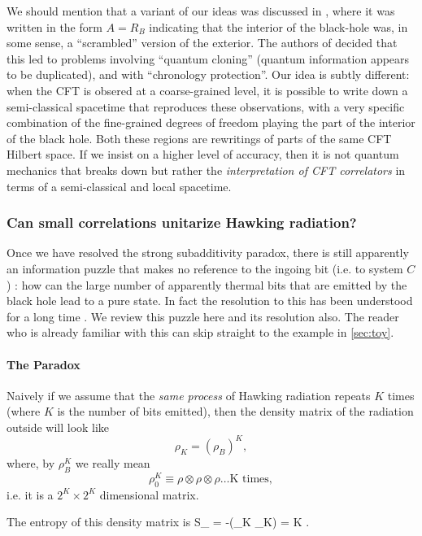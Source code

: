 We should mention that a variant of our ideas was discussed in \cite{Bousso:2012as,Susskind:2012uw}, where it was written in the form $A = R_B$ indicating that the interior of the black-hole was, in some sense, a ``scrambled'' version of the exterior. The authors of \cite{Bousso:2012as,Susskind:2012uw} decided that this led to problems involving ``quantum cloning'' (quantum information appears to be duplicated), and with ``chronology protection''. Our idea is subtly different: when the CFT is obsered at a coarse-grained level, it is possible to write down a semi-classical spacetime that reproduces these observations, with a very specific combination of the fine-grained degrees of freedom playing the part of the interior of the black hole. Both these regions are rewritings of parts of the same CFT Hilbert space. If we insist on a higher level of accuracy, then it is not quantum mechanics that breaks down but rather the {\em interpretation of CFT correlators} in terms of a semi-classical and local spacetime. 

\subsubsection{Can small correlations unitarize Hawking radiation?}
Once we have resolved the strong subadditivity paradox, there is still
apparently an information puzzle that makes no reference to the ingoing bit (i.e. to system $C$) : how can the large number of apparently
thermal bits that are emitted by the black hole lead to a pure state. In fact the resolution to this has
been understood for a long time \cite{Page:1993df}. We review this puzzle here and its resolution also.  The reader who is already familiar with this
can skip straight to the example in \ref{sec:toy}.
\paragraph{The Paradox\\}
Naively if we assume that the {\em same process} of Hawking radiation repeats $K$ times (where $K$ is the number of bits emitted), then the density matrix of the radiation outside will look like
\[
\rho_K = (\rho_B)^K,
 \]
where, by $\rho_B^K$ we really mean
\[
\rho_0^K \equiv \rho \otimes \rho \otimes \rho \ldots {\text{K~times}},
 \]
i.e. it is a $2^K \times 2^K$ dimensional matrix.

The entropy of this density matrix is
\be
\label{entangleK}
S_{} = -\tr(\rho_K \ln \rho_K) = K .
\ee

